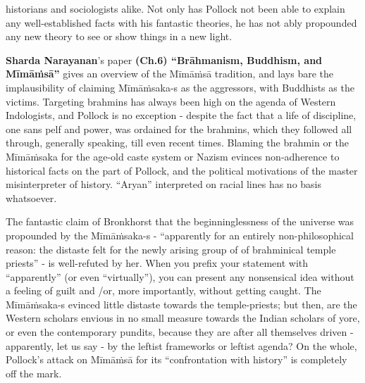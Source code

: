 historians and sociologists alike. Not only has Pollock not been able to explain any well-established facts with his fantastic theories, he has not ably propounded any new theory to see or show things in a new light.


\textbf{Sharda Narayanan}’s paper \textbf{(Ch.6) “Brāhmanism, Buddhism, and Mīmāṁsā”} gives an overview of the Mīmāṁsā tradition, and lays bare the implausibility of claiming Mīmāṁsaka-s as the aggressors, with Buddhists as the victims. Targeting brahmins has always been high on the agenda of Western Indologists, and Pollock is no exception - despite the fact that a life of discipline, one sans pelf and power, was ordained for the brahmins, which they followed all through, generally speaking, till even recent times. Blaming the brahmin or the Mīmāṁsaka for the age-old caste system or Nazism evinces non-adherence to historical facts on the part of Pollock, and the political motivations of the master misinterpreter of history. “Aryan” interpreted on racial lines has no basis whatsoever.

The fantastic claim of Bronkhorst that the beginninglessness of the universe was propounded by the Mīmāṁsaka-s - “apparently for an entirely non-philosophical reason: the distaste felt for the newly arising group of of brahminical temple priests” - is well-refuted by her. When you prefix your statement with “apparently” (or even “virtually”), you can present any nonsensical idea without a feeling of guilt and /or, more importantly, without getting caught. The Mīmāṁsaka-s evinced little distaste towards the temple-priests; but then, are the Western scholars envious in no small measure towards the Indian scholars of yore, or even the contemporary pundits, because they are after all themselves driven - apparently, let us say - by the leftist frameworks or leftist agenda? On the whole, Pollock’s attack on Mīmāṁsā for its “confrontation with history” is completely off the mark.

